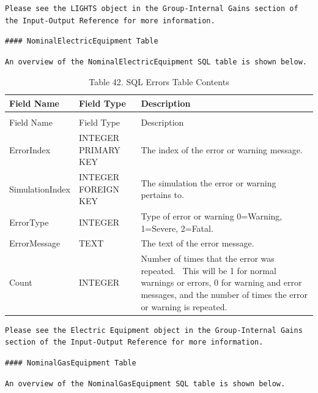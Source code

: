 \begin{lstlisting}
Please see the LIGHTS object in the Group-Internal Gains section of the Input-Output Reference for more information.
\end{lstlisting}

\begin{lstlisting}
#### NominalElectricEquipment Table
\end{lstlisting}

\begin{lstlisting}
An overview of the NominalElectricEquipment SQL table is shown below.
\end{lstlisting}

\begin{longtable}[c]{p{1.5in}p{1.5in}p{2.99in}}
\caption{Table 42. SQL Errors Table Contents \label{table:table-42.-sql-errors-table-contents}} \tabularnewline
\toprule 
Field Name & Field Type & Description \tabularnewline
\midrule
\endfirsthead

\caption[]{Table 42. SQL Errors Table Contents} \tabularnewline
\toprule 
Field Name & Field Type & Description \tabularnewline
\midrule
\endhead

ErrorIndex & INTEGER PRIMARY KEY & The index of the error or warning message. \tabularnewline
SimulationIndex & INTEGER FOREIGN KEY & The simulation the error or warning pertains to. \tabularnewline
ErrorType & INTEGER & Type of error or warning 0=Warning, 1=Severe, 2=Fatal. \tabularnewline
ErrorMessage & TEXT & The text of the error message. \tabularnewline
Count & INTEGER & Number of times that the error was repeated.~ This will be 1 for normal warnings or errors, 0 for warning and error messages, and the number of times the error or warning is repeated. \tabularnewline
\bottomrule
\end{longtable}

\begin{lstlisting}
Please see the Electric Equipment object in the Group-Internal Gains section of the Input-Output Reference for more information.
\end{lstlisting}

\begin{lstlisting}
#### NominalGasEquipment Table
\end{lstlisting}

\begin{lstlisting}
An overview of the NominalGasEquipment SQL table is shown below.
\end{lstlisting}

